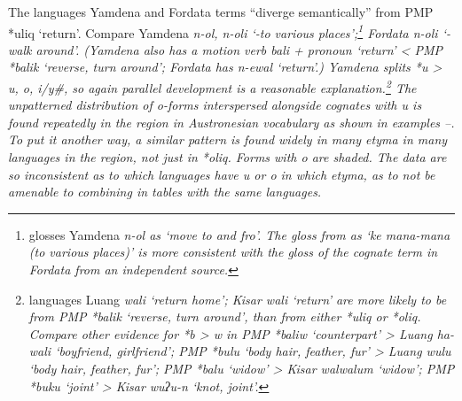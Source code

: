 The  languages Yamdena
and Fordata terms “diverge semantically” from PMP *uliq ‘return’.
Compare Yamdena \it{n-ol, n-oli} ‘-to various places’;\footnote{
		\citet[247]{Blust1993}
		glosses Yamdena \it{n-ol} as ‘move to and fro’.
		The gloss from \citet{MettlerMettler1996} as ‘ke mana-mana (to
		various places)’ is more consistent with the gloss of the cognate
		term in Fordata from an independent source.}
Fordata \it{n-oli} ‘-walk around’.
(Yamdena also has a motion verb \it{bali} + pronoun ‘return’
< PMP *balik ‘reverse,
turn around’; Fordata has \it{n-ewal} ‘return’.) Yamdena splits
*u > \it{u, o, i/y}{\#}, so again parallel development is a reasonable explanation.\footnote{
		 languages Luang \it{wali} ‘return home’; Kisar \it{wali}
		‘return’ are more likely to be from PMP *balik ‘reverse,
		turn around’, than from either *uliq or *oliq.
		Compare other evidence for *b > \it{w} in PMP *baliw ‘counterpart’
		> Luang \it{ha-wali} ‘boyfriend,
		girlfriend’; PMP *bulu ‘body hair,
		feather, fur’ > Luang \it{wulu} ‘body hair,
		feather, fur’; PMP *balu ‘widow’ > Kisar \it{wal{\tl}walum} ‘widow’;
		PMP *buku ‘joint’ > Kisar \it{wuʔu-n} ‘knot,
		joint’.} 
The unpatterned distribution of \it{o}-forms interspersed alongside
cognates with \it{u} is found repeatedly in the region in Austronesian
vocabulary as shown in examples --.
To put it another way,
a similar pattern is found widely in many etyma in many languages
in the region, not just in *oliq.
Forms with \it{o} are shaded.
The data are so inconsistent as to which languages have \it{u}
or \it{o} in which etyma,
as to not be amenable to combining in tables with the same languages.


